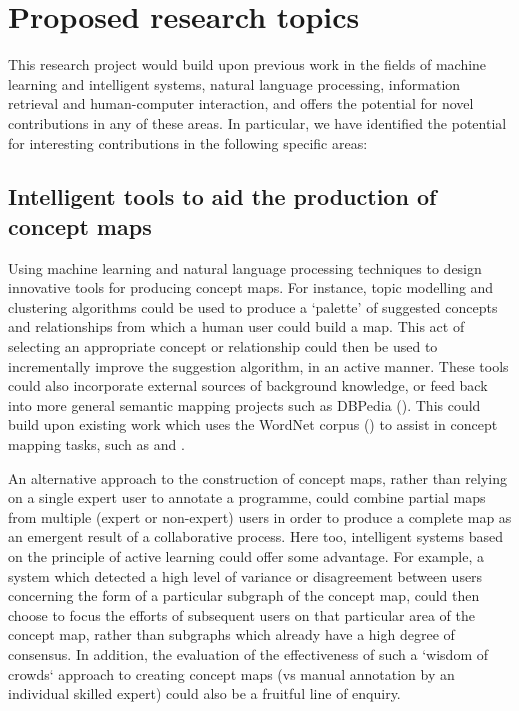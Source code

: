 \documentclass[a4paper, 11pt]{article}
\begin{document}
\section{Proposed research topics}
\label{sec:Proposed research topics}

This research project would build upon previous work in the fields of machine learning and intelligent systems, natural language processing, information retrieval and human-computer interaction, and offers the potential for novel contributions in any of these areas. In particular, we have identified the potential for interesting contributions in the following specific areas:

\subsection{Intelligent tools to aid the production of concept maps}

Using machine learning and natural language processing techniques to design innovative tools for producing concept maps. For instance, topic modelling and clustering algorithms could be used to produce a `palette' of suggested concepts and relationships from which a human user could build a map. This act of selecting an appropriate concept or relationship could then be used to incrementally improve the suggestion algorithm, in an active manner. These tools could also incorporate external sources of background knowledge, or feed back into more general semantic mapping projects such as DBPedia (\cite{Auer2007}). This could build upon existing work which uses the WordNet corpus (\cite{PrincetonUniversity2010}) to assist in concept mapping tasks, such as \cite{Kornilakis} and \cite{Canas2003}.

An alternative approach to the construction of concept maps, rather than relying on a single expert user to annotate a programme, could combine partial maps from multiple (expert or non-expert) users in order to produce a complete map as an emergent result of a collaborative process. Here too, intelligent systems based on the principle of active learning could offer some advantage. For example, a system which detected a high level of variance or disagreement between users concerning the form of a particular subgraph of the concept map, could then choose to focus the efforts of subsequent users on that particular area of the concept map, rather than subgraphs which already have a high degree of consensus. In addition, the evaluation of the effectiveness of such a `wisdom of crowds` approach to creating concept maps (vs manual annotation by an individual skilled expert) could also be a fruitful line of enquiry.
\end{document}
